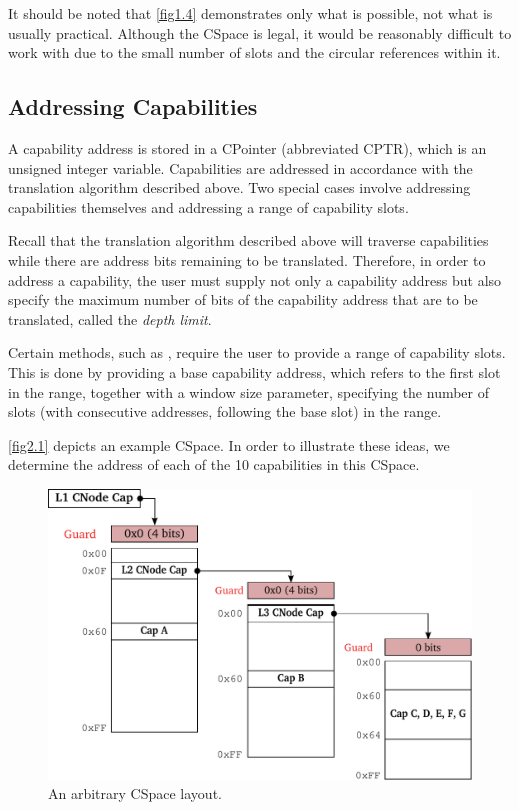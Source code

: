 It should be noted that \autoref{fig1.4} demonstrates only what is
possible, not what is usually practical. Although the CSpace is legal,
it would be reasonably difficult to work with due to the small number
of slots and the circular references within it.


\subsection{Addressing Capabilities}
\label{sec:cap_addressing}

A capability address is stored in a CPointer (abbreviated CPTR), which
is an unsigned integer variable. Capabilities are addressed in
accordance with the translation algorithm described above.  Two
special cases involve addressing  capabilities themselves
and addressing a range of capability slots.

Recall that the translation algorithm described above will traverse
 capabilities while there are address bits remaining to be
translated. Therefore, in order to address a  capability,
the user must supply not only a capability address but also specify
the maximum number of bits of the capability address that are to be
translated, called the \emph{depth limit}.

Certain methods, such as
, require the user to
provide a range of capability slots. This is done by providing a base
capability address, which refers to the first slot in the range,
together with a window size parameter, specifying the number of slots
(with consecutive addresses, following the base slot) in the range.


\autoref{fig2.1} depicts an example CSpace. In order to illustrate
these ideas, we determine the address of each of the 10 capabilities
in this CSpace.

\begin{figure}[tb]
  \begin{center}
    \includegraphics[scale=0.5]{figs/fig2-1.pdf}
    \caption{An arbitrary CSpace layout.}
    \label{fig2.1}
  \end{center}
\end{figure}


